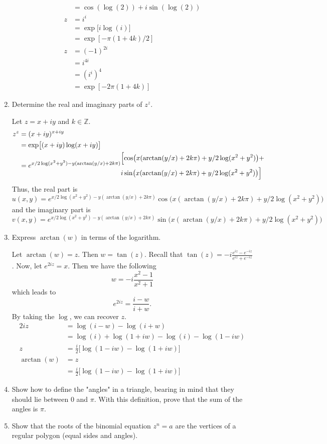 \begin{enumerate}
\begin{align*}
      & = \cos(\log(2)) + i\sin(\log(2))\\
    z & = i^i\\
      & = \exp\bigl[i\log(i)\bigr]\\
      & = \exp[-\pi(1 + 4k)/2]\\
    z & = (-1)^{2i}\\
      & = i^{4i}\\
      & = (i^i)^4\\
      & = \exp[-2\pi(1 + 4k)]
  \end{align*}
\item
  Determine the real and imaginary parts of \(z^z\).
  \par\smallskip
  Let \(z = x + iy\) and \(k\in\mathbb{Z}\).
  \begin{align*}
    z^z & = (x + iy)^{x + iy}\\
        & = \exp\bigl[(x + iy)\log(x + iy)\bigr]\\
        & = e^{x/2\log(x^2 + y^2) - y(\arctan(y/x) + 2k\pi)}
          \begin{aligned}
            &
            \Bigl[\cos\bigl(x(\arctan(y/x) + 2k\pi) + y/2\log(x^2 + y^2)\bigr)
            +\\
            &
            i\sin\bigl(x(\arctan(y/x) + 2k\pi) + y/2\log(x^2 + y^2)\bigr)\Bigr]
          \end{aligned}
  \end{align*}
  Thus, the real part is
  \[
  u(x, y) = e^{x/2\log(x^2 + y^2) - y(\arctan(y/x) + 2k\pi)}
  \cos\bigl(x(\arctan(y/x) + 2k\pi) + y/2\log(x^2 + y^2)\bigr)
  \]
  and the imaginary part is
  \[
  v(x, y) = e^{x/2\log(x^2 + y^2) - y(\arctan(y/x) + 2k\pi)}
  \sin\bigl(x(\arctan(y/x) + 2k\pi) + y/2\log(x^2 + y^2)\bigr)
  \]
\item
  Express \(\arctan(w)\) in terms of the logarithm.
  \par\smallskip
  Let \(\arctan(w) = z\).
  Then \(w = \tan(z)\).
  Recall that \(\tan(z) = -i\frac{e^{iz} - e^{-iz}}{e^{iz} + e^{-iz}}\).
  Now, let \(e^{2iz} = x\).
  Then we have the following
  \[
  w = -i\frac{x^2 - 1}{x^2 + 1}
  \]
  which leads to
  \[
  e^{2iz} = \frac{i - w}{i + w}.
  \]
  By taking the \(\log\), we can recover \(z\).
  \begin{align*}
    2iz & = \log(i - w) - \log(i + w)\\
        & = \log(i) + \log(1 + iw) - \log(i) - \log(1 - iw)\\
    z & = \frac{i}{2}\bigl[\log(1 - iw) - \log(1 + iw)\bigr]\\
    \arctan(w) & = z\\
        & = \frac{i}{2}\bigl[\log(1 - iw) - \log(1 + iw)\bigr]
  \end{align*}
\item
  Show how to define the "angles" in a triangle, bearing in mind that they
  should lie between \(0\) and \(\pi\).
  With this definition, prove that the sum of the angles is \(\pi\).
\item
  Show that the roots of the binomial equation \(z^n = a\) are the vertices of
  a regular polygon (equal sides and angles).
\end{enumerate}


